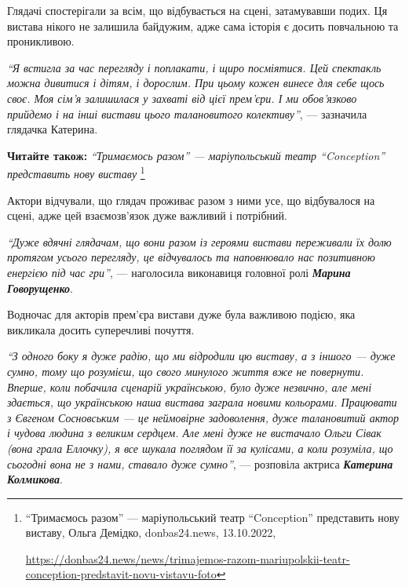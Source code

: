 Глядачі спостерігали за всім, що відбувається на сцені, затамувавши подих. Ця
вистава нікого не залишила байдужим, адже сама історія є досить повчальною та
проникливою.

\begin{leftbar}
  \begingroup
\emph{\enquote{Я встигла за час перегляду і поплакати, і щиро посміятися. Цей спектакль можна
дивитися і дітям, і дорослим. При цьому кожен винесе для себе щось
своє. Моя сім'я залишилася у захваті від цієї прем'єри. І ми
обов'язково прийдемо і на інші вистави цього талановитого колективу}}, —
зазначила глядачка Катерина.
  \endgroup
\end{leftbar}

\textbf{Читайте також:} \emph{\enquote{Тримаємось разом} — маріупольський театр \enquote{Conception} представить нову виставу}%
\footnote{\enquote{Тримаємось разом} — маріупольський театр \enquote{Conception} представить нову виставу, %
Ольга Демідко, donbas24.news, 13.10.2022, \par%
\url{https://donbas24.news/news/trimajemos-razom-mariupolskii-teatr-conception-predstavit-novu-vistavu-foto}%
}


Актори відчували, що глядач проживає разом з ними усе, що відбувалося на сцені,
адже цей взаємозв'язок дуже важливий і потрібний.

\begin{leftbar}
  \begingroup
\emph{\enquote{Дуже вдячні глядачам, що вони разом із героями вистави переживали їх долю
протягом усього перегляду, це відчувалось та наповнювало нас позитивною
енергією під час гри}}, — наголосила виконавиця головної ролі \emph{\textbf{Марина
Говорущенко}}. 
  \endgroup
\end{leftbar}

Водночас для акторів прем'єра вистави дуже була важливою подією, яка викликала
досить суперечливі почуття.

\begin{leftbar}
  \begingroup
\emph{\enquote{З одного боку я дуже радію, що ми відродили цю виставу, а з іншого — дуже
сумно, тому що розумієш, що свого минулого життя вже не повернути. Вперше, коли
побачила сценарій українською, було дуже незвично, але мені здається, що
українською наша вистава заграла новими кольорами. Працювати з Євгеном
Сосновським — це неймовірне задоволення, дуже талановитий актор і чудова людина
з великим сердцем. Але мені дуже не вистачало Ольги Сівак (вона грала Еллочку),
я все шукала поглядом її за кулісами, а коли розуміла, що сьогодні вона не з
нами, ставало дуже сумно}}, — розповіла актриса \emph{\textbf{Катерина Колмикова}}.
  \endgroup
\end{leftbar}

